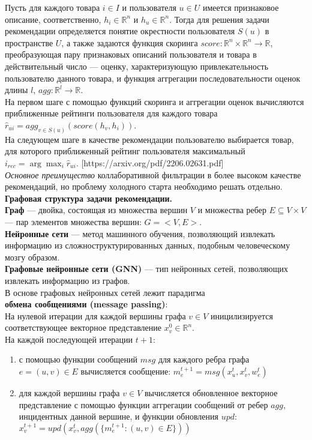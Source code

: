 \documentclass{mipt-thesis-ms}
\begin{document}
Пусть для каждого товара $i \in I$ и пользователя $u \in U$ имеется признаковое описание, соответственно, $h_i \in \mathbb{R}^n$ и $h_u \in \mathbb{R}^n$. Тогда для решения задачи рекомендации определяется понятие окрестности пользователя $S(u)$ в пространстве $U$, а также задаются функция скоринга $score: \mathbb{R}^n \times \mathbb{R}^n \rightarrow \mathbb{R}$, преобразующая пару признаковых описаний пользователя и товара в действительный число --- оценку, характеризующую привлекательность пользователю данного товара, и функция аггрегации последовательности оценок длины $l$, $agg: \mathbb{R}^l \rightarrow \mathbb{R}$. \\
На первом шаге с помощью функций скоринга и аггрегации оценок вычисляются приближенные рейтинги пользователя для каждого товара $\hat r_{ui} = {agg}_{v \in S(u)}(score(h_v, h_i))$. \\
На следующем шаге в качестве рекомендации пользователю выбирается товар, для которого приближенный рейтинг пользователя максимальный $i_{rec} = \arg \max_i \hat r_{ui}$. [https://arxiv.org/pdf/2206.02631.pdf]
\\

{\it Основное преимущество} коллаборативной фильтрации в более высоком качестве рекомендаций, но проблему холодного старта необходимо решать отдельно.
\\

{\bf Графовая структура задачи рекомендации.}\\
{\bf Граф} --- двойка, состоящая из множества вершин $V$ и множества ребер $E \subseteq V \times V$ --- пар элементов множества вершин: \:$G = <V, E>$.\\
{\bf Нейронные сети} --- метод машинного обучения, позволяющий извлекать информацию из сложноструктурированных данных, подобным человеческому мозгу образом.\\
{\bf Графовые нейронные сети (GNN)} --- тип нейронных сетей, позволяющих извлекать информацию из графов. \\
В основе графовых нейронных сетей лежит парадигма\\{\bf обмена сообщениями (message passing)}:
\\На нулевой итерации для каждой вершины графа $v \in V$ иницилизируется соответствующее векторное представление $x_v^0 \in \mathbb{R}^n$.
\\На каждой последующей итерации $t+1$:
\begin{enumerate}
    \item с помощью функции сообщений $msg$ для каждого ребра графа $e = (u, v) \in E$ вычисляется сообщение: $m_e^{t+1} = msg(x_u^t, x_v^t, w_e^t)$
    \item для каждой вершины графа $v \in V$ вычисляется обновленное векторное представление с помощью функции аггрегации сообщений от ребер $agg$, инцидентных данной вершине, и функции обновления $upd$: $x_v^{t+1} = upd(x_v^t, agg(\{m_e^{t+1}: (u, v) \in E\}))$
\end{enumerate}
\end{document}
